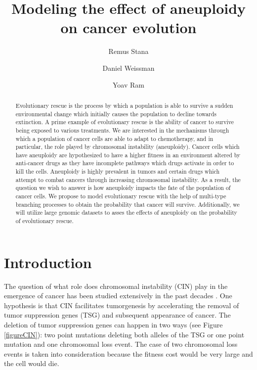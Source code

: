 \documentclass[11pt,a4paper]{article}
\begin{document}
\title{Modeling the effect of aneuploidy on cancer evolution}
\author[1]{Remus Stana}
\author[2]{‪Daniel Weissman}
\author[1]{Yoav Ram}
\maketitle
\begin{abstract}
Evolutionary rescue is the process by which a population is able to survive a sudden environmental change which initially causes the population to decline towards extinction. A prime example of evolutionary rescue is the ability of cancer to survive being exposed to various treatments. We are interested in the mechanisms through which a population of cancer cells are able to adapt to chemotherapy, and in particular, the role played by chromosomal instability (aneuploidy). Cancer cells which have aneuploidy are hypothesized to have a higher fitness in an environment altered by anti-cancer drugs as they have incomplete pathways which drugs activate in order to kill the cells. Aneuploidy is highly prevalent in tumors and certain drugs which attempt to combat cancers through increasing chromosomal instability. As a result, the question we wish to answer is how aneuploidy impacts the fate of the population of cancer cells. We propose to model evolutionary rescue with the help of multi-type branching processes to obtain the probability that cancer will survive. Additionally, we will utilize large genomic datasets to asses the effects of aneuploidy on the probability of evolutionary rescue.
\end{abstract}

\section{Introduction}
The question of what role does chromosomal instability (CIN) play in the emergence of cancer has been studied extensively in the past decades \cite{michor2005can,christine2018understanding,nowak2002role,pavelka2010dr,komarova2003mutation,zhu2018cellular}. One hypothesis is that CIN facilitates tumorgenesis by accelerating the removal of tumor suppression genes (TSG) and subsequent appearance of cancer. The deletion of tumor suppression genes can happen in two ways (see Figure \ref{figureCIN}): two point mutations deleting both alleles of the TSG or one point mutation and one chromosomal loss event. The case of two chromosomal loss events is taken into consideration because the fitness cost would be very large and the cell would die.
\end{document}
